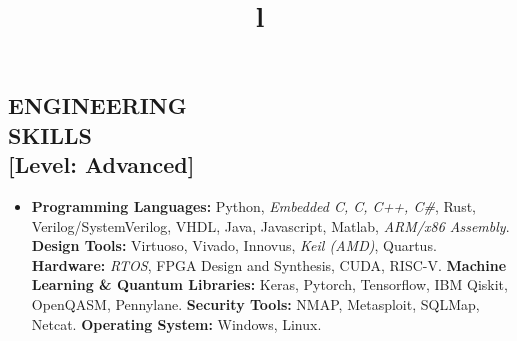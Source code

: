 \documentclass[line,margin,9pt]{res}
\begin{document}
\begin{resume}
\section{ENGINEERING\\SKILLS\\\textbf{[Level: Advanced]}}
\begin{itemize}
\item \textbf{Programming Languages:} Python, \textit{Embedded C, C, C++, C\#}, Rust, Verilog/SystemVerilog, VHDL, Java, Javascript, Matlab,\textit{ ARM/x86 Assembly}. \textbf{Design Tools:} Virtuoso, Vivado, Innovus,  \textit{Keil (AMD)}, Quartus. \textbf{Hardware:} \textit{RTOS}, FPGA Design and Synthesis, CUDA, RISC-V. \textbf{Machine Learning \& Quantum Libraries:} Keras, Pytorch, Tensorflow, IBM Qiskit, OpenQASM, Pennylane. \textbf{Security Tools:} NMAP, Metasploit, SQLMap, Netcat. \textbf{Operating System:} Windows, Linux.
\end{itemize}
\begin{format}
\title{l}\\
\\
\body\\
\end{format}






\end{resume}
\end{document}
